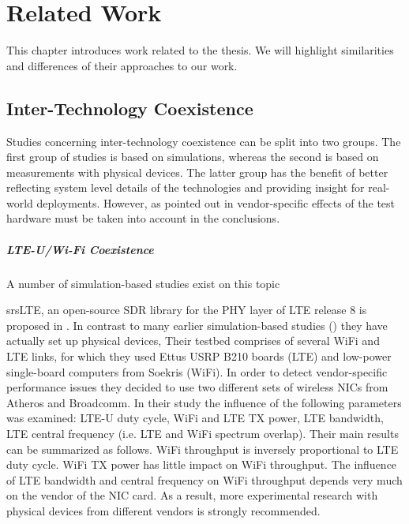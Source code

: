 \chapter{Related Work}
\label{ch:related-work}

This chapter introduces work related to the thesis. We will highlight similarities and differences of their approaches to our work. 

\section{Inter-Technology Coexistence}

Studies concerning inter-technology coexistence can be split into two groups. The first group of studies is based on simulations, whereas the second is based on measurements with physical devices. The latter group has the benefit of better reflecting system level details of the technologies and providing insight for real-world deployments. However, as pointed out in \cite{gomezmiguelez16} vendor-specific effects of the test hardware must be taken into account in the conclusions. 

\paragraph{LTE-U/Wi-Fi Coexistence}
A number of simulation-based studies exist on this topic 

srsLTE, an open-source SDR library for the PHY layer of LTE release 8 is proposed in . In contrast to many earlier simulation-based studies () they have actually set up physical devices,  Their testbed comprises of several WiFi and LTE links, for which they used Ettus USRP B210 boards (LTE) and low-power single-board computers from Soekris (WiFi). In order to detect vendor-specific performance issues they decided to use two different sets of wireless NICs from Atheros and Broadcomm. In their study the influence of the following parameters was examined: LTE-U duty cycle, WiFi and LTE TX power, LTE bandwidth, LTE central frequency (i.e. LTE and WiFi spectrum overlap). Their main results can be summarized as follows. WiFi throughput is inversely proportional to LTE duty cycle. WiFi TX power has little impact on WiFi throughput. The influence of LTE bandwidth and central frequency on WiFi throughput depends very much on the vendor of the NIC card. As a result, more experimental research with physical devices from different vendors is strongly recommended. 

